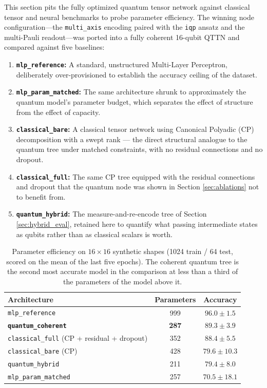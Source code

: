 \documentclass[12pt, a4paper, oneside]{report}
\begin{document}
This section pits the fully optimized quantum tensor network against classical tensor and neural benchmarks to probe parameter efficiency. The winning node configuration---the \texttt{multi\_axis} encoding paired with the \texttt{iqp} ansatz and the multi-Pauli readout---was ported into a fully coherent 16-qubit QTTN and compared against five baselines:

\begin{enumerate}
    \item \textbf{\texttt{mlp\_reference}:} A standard, unstructured Multi-Layer Perceptron, deliberately over-provisioned to establish the accuracy ceiling of the dataset.
    \item \textbf{\texttt{mlp\_param\_matched}:} The same architecture shrunk to approximately the quantum model's parameter budget, which separates the effect of structure from the effect of capacity.
    \item \textbf{\texttt{classical\_bare}:} A classical tensor network using Canonical Polyadic (CP) decomposition with a swept rank --- the direct structural analogue to the quantum tree under matched constraints, with no residual connections and no dropout.
    \item \textbf{\texttt{classical\_full}:} The same CP tree equipped with the residual connections and dropout that the quantum node was shown in Section \ref{sec:ablations} not to benefit from.
    \item \textbf{\texttt{quantum\_hybrid}:} The measure-and-re-encode tree of Section \ref{sec:hybrid_eval}, retained here to quantify what passing intermediate states as qubits rather than as classical scalars is worth.
\end{enumerate}

\begin{table}[hbt!]
    \centering
    \begin{tabular}{l c c}
        \toprule
        \textbf{Architecture} & \textbf{Parameters} & \textbf{Accuracy} \\
        \midrule
        \texttt{mlp\_reference}    & 999 & $96.0 \pm 1.5$ \\
        \midrule
        \textbf{\texttt{quantum\_coherent}} & \textbf{287} & $\mathbf{89.3 \pm 3.9}$ \\
        \texttt{classical\_full} (CP + residual + dropout) & 352 & $88.4 \pm 5.5$ \\
        \texttt{classical\_bare} (CP) & 428 & $79.6 \pm 10.3$ \\
        \texttt{quantum\_hybrid} & 211 & $79.4 \pm 8.0$ \\
        \texttt{mlp\_param\_matched} & 257 & $70.5 \pm 18.1$ \\
        \bottomrule
    \end{tabular}
    \caption{Parameter efficiency on $16 \times 16$ synthetic shapes (1024 train / 64 test, scored on the mean of the last five epochs). The coherent quantum tree is the second most accurate model in the comparison at less than a third of the parameters of the model above it.}
    \label{tab:model_comparison}
\end{table}
\end{document}
